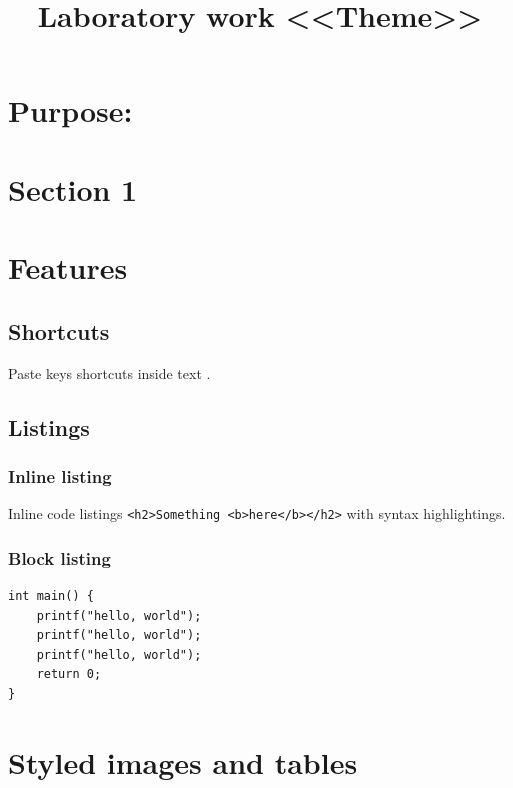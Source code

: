 \documentclass{tokaev-base}
\title{Laboratory work <<Theme>>}
\begin{document}
\maketitle
\section*{Purpose: }

\lipsum[1]

\section{Section 1}

\lipsum[1-2]

\section{Features}

\subsection[short]{Shortcuts}

Paste keys shortcuts inside text .

\subsection[short]{Listings}

\subsubsection[short]{Inline listing}

Inline code listings \texttt{<h2>Something <b>here</b></h2>} with syntax highlightings.

\subsubsection[short]{Block listing}

\begin{verbatim}
int main() {
    printf("hello, world");
    printf("hello, world");
    printf("hello, world");
    return 0;
}
\end{verbatim}

\section{Styled images and tables}
\end{document}
